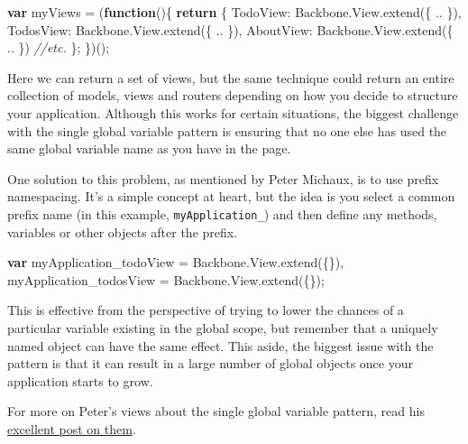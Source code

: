 \documentclass[9pt]{book}
\newenvironment{Shaded}{}{}
\newcommand{\KeywordTok}[1]{\textcolor[rgb]{0.00,0.44,0.13}{\textbf{{#1}}}}
\newcommand{\DataTypeTok}[1]{\textcolor[rgb]{0.56,0.13,0.00}{{#1}}}
\newcommand{\CommentTok}[1]{\textcolor[rgb]{0.38,0.63,0.69}{\textit{{#1}}}}
\newcommand{\OtherTok}[1]{\textcolor[rgb]{0.00,0.44,0.13}{{#1}}}
\newcommand{\FunctionTok}[1]{\textcolor[rgb]{0.02,0.16,0.49}{{#1}}}
\newcommand{\NormalTok}[1]{{#1}}
\begin{document}
\begin{Shaded}
\begin{Highlighting}[]
\KeywordTok{var} \NormalTok{myViews = (}\KeywordTok{function}\NormalTok{()\{}
    \KeywordTok{return} \NormalTok{\{}
        \DataTypeTok{TodoView}\NormalTok{: }\OtherTok{Backbone}\NormalTok{.}\OtherTok{View}\NormalTok{.}\FunctionTok{extend}\NormalTok{(\{ .. \}),}
        \DataTypeTok{TodosView}\NormalTok{: }\OtherTok{Backbone}\NormalTok{.}\OtherTok{View}\NormalTok{.}\FunctionTok{extend}\NormalTok{(\{ .. \}),}
        \DataTypeTok{AboutView}\NormalTok{: }\OtherTok{Backbone}\NormalTok{.}\OtherTok{View}\NormalTok{.}\FunctionTok{extend}\NormalTok{(\{ .. \})}
        \CommentTok{//etc.}
    \NormalTok{\};}
\NormalTok{\})();}
\end{Highlighting}
\end{Shaded}

Here we can return a set of views, but the same technique could return
an entire collection of models, views and routers depending on how you
decide to structure your application. Although this works for certain
situations, the biggest challenge with the single global variable
pattern is ensuring that no one else has used the same global variable
name as you have in the page.

One solution to this problem, as mentioned by Peter Michaux, is to use
prefix namespacing. It's a simple concept at heart, but the idea is you
select a common prefix name (in this example, \texttt{myApplication\_})
and then define any methods, variables or other objects after the
prefix.

\begin{Shaded}
\begin{Highlighting}[]
\KeywordTok{var} \NormalTok{myApplication_todoView = }\OtherTok{Backbone}\NormalTok{.}\OtherTok{View}\NormalTok{.}\FunctionTok{extend}\NormalTok{(\{\}),}
    \NormalTok{myApplication_todosView = }\OtherTok{Backbone}\NormalTok{.}\OtherTok{View}\NormalTok{.}\FunctionTok{extend}\NormalTok{(\{\});}
\end{Highlighting}
\end{Shaded}

This is effective from the perspective of trying to lower the chances of
a particular variable existing in the global scope, but remember that a
uniquely named object can have the same effect. This aside, the biggest
issue with the pattern is that it can result in a large number of global
objects once your application starts to grow.

For more on Peter's views about the single global variable pattern, read
his \href{http://michaux.ca/articles/javascript-namespacing}{excellent
post on them}.
\end{document}
